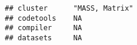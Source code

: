 \documentclass[]{book}
\begin{document}
\begin{verbatim}
## cluster      "MASS, Matrix"                                                                                                                                                                                                                                                                                                                                                                                                                                                                                                                                                                                                                                                                                            
## codetools    NA                                                                                                                                                                                                                                                                                                                                                                                                                                                                                                                                                                                                                                                                                                        
## compiler     NA                                                                                                                                                                                                                                                                                                                                                                                                                                                                                                                                                                                                                                                                                                        
## datasets     NA                                                                                                                                                                                                                                                                                                                                                                                                                                                                                                                                                                                                                                                                                                        

\end{verbatim}
\end{document}

